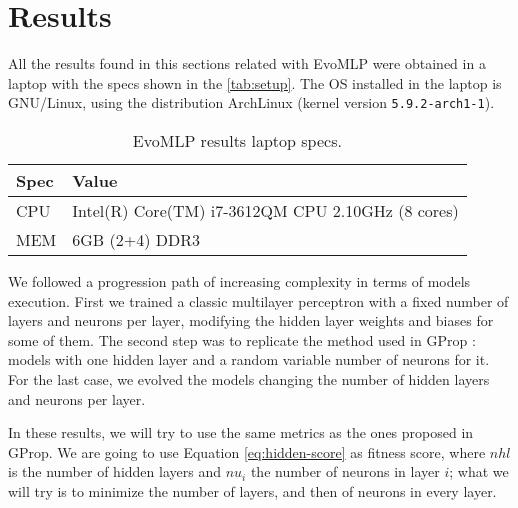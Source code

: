 \documentclass[runningheads]{llncs}
\begin{document}
\section{Results}
\label{sec:res}


All the results found in this sections related with {\sf EvoMLP}
\cite{deep-g-prop:anon} were obtained in a laptop with the specs shown in the
\autoref{tab:setup}. The OS installed in the laptop is GNU/Linux, using the
distribution ArchLinux (kernel version \texttt{5.9.2-arch1-1}).

\begin{table}[]
  \centering
  \caption{{\sf EvoMLP} results laptop specs.}
  \label{tab:setup}
  \begin{tabular}{|l|l|}
  \hline
    Spec & Value                                             \\ \hline
    CPU  & Intel(R) Core(TM) i7-3612QM CPU 2.10GHz (8 cores) \\ \hline
    MEM  & 6GB (2+4) DDR3                                    \\ \hline
  \end{tabular}
\end{table}

We followed a progression path of increasing complexity in terms of models
execution. First we trained a classic multilayer perceptron with a fixed number
of layers and neurons per layer, modifying the hidden layer weights and biases
for some of them. The second step was to replicate the method used in GProp
\cite{castilloNC,CastilloNPL}: models with one hidden layer and a random
variable number of neurons for it. For the last case, we evolved the models
changing the number of hidden layers and neurons per layer.

In these results, we will try to use the same metrics as the ones
proposed in GProp. We are going to use Equation
\ref{eq:hidden-score} as fitness score, where $nhl$ is the number of
hidden layers and $nu_{i}$ the number of neurons in layer $i$; what we
will try is to minimize the number of layers, and then of neurons in
every layer.

\end{document}
